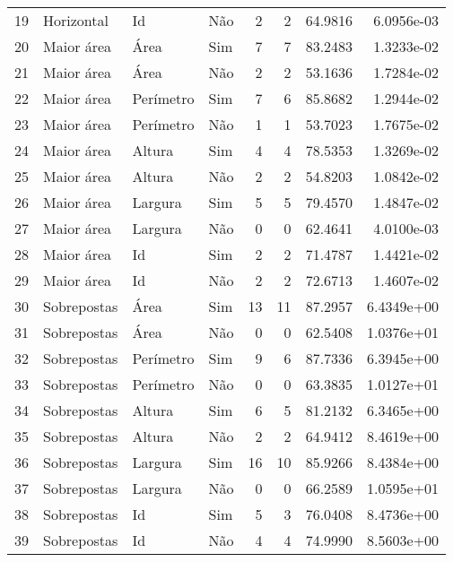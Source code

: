 \begin{tabular}{rlllrrrr}
19 & Horizontal  & Id        & Não     & 2        & 2       & 64.9816      & 6.0956e-03 \\
20 & Maior área  & Área      & Sim     & 7        & 7       & 83.2483      & 1.3233e-02 \\
21 & Maior área  & Área      & Não     & 2        & 2       & 53.1636      & 1.7284e-02 \\
22 & Maior área  & Perímetro & Sim     & 7        & 6       & 85.8682      & 1.2944e-02 \\
23 & Maior área  & Perímetro & Não     & 1        & 1       & 53.7023      & 1.7675e-02 \\
24 & Maior área  & Altura    & Sim     & 4        & 4       & 78.5353      & 1.3269e-02 \\
25 & Maior área  & Altura    & Não     & 2        & 2       & 54.8203      & 1.0842e-02 \\
26 & Maior área  & Largura   & Sim     & 5        & 5       & 79.4570      & 1.4847e-02 \\
27 & Maior área  & Largura   & Não     & 0        & 0       & 62.4641      & 4.0100e-03 \\
28 & Maior área  & Id        & Sim     & 2        & 2       & 71.4787      & 1.4421e-02 \\
29 & Maior área  & Id        & Não     & 2        & 2       & 72.6713      & 1.4607e-02 \\
30 & Sobrepostas & Área      & Sim     & 13       & 11      & 87.2957      & 6.4349e+00 \\
31 & Sobrepostas & Área      & Não     & 0        & 0       & 62.5408      & 1.0376e+01 \\
32 & Sobrepostas & Perímetro & Sim     & 9        & 6       & 87.7336      & 6.3945e+00 \\
33 & Sobrepostas & Perímetro & Não     & 0        & 0       & 63.3835      & 1.0127e+01 \\
34 & Sobrepostas & Altura    & Sim     & 6        & 5       & 81.2132      & 6.3465e+00 \\
35 & Sobrepostas & Altura    & Não     & 2        & 2       & 64.9412      & 8.4619e+00 \\
36 & Sobrepostas & Largura   & Sim     & 16       & 10      & 85.9266      & 8.4384e+00 \\
37 & Sobrepostas & Largura   & Não     & 0        & 0       & 66.2589      & 1.0595e+01 \\
38 & Sobrepostas & Id        & Sim     & 5        & 3       & 76.0408      & 8.4736e+00 \\
39 & Sobrepostas & Id        & Não     & 4        & 4       & 74.9990      & 8.5603e+00 \\
\hline
\end{tabular}
